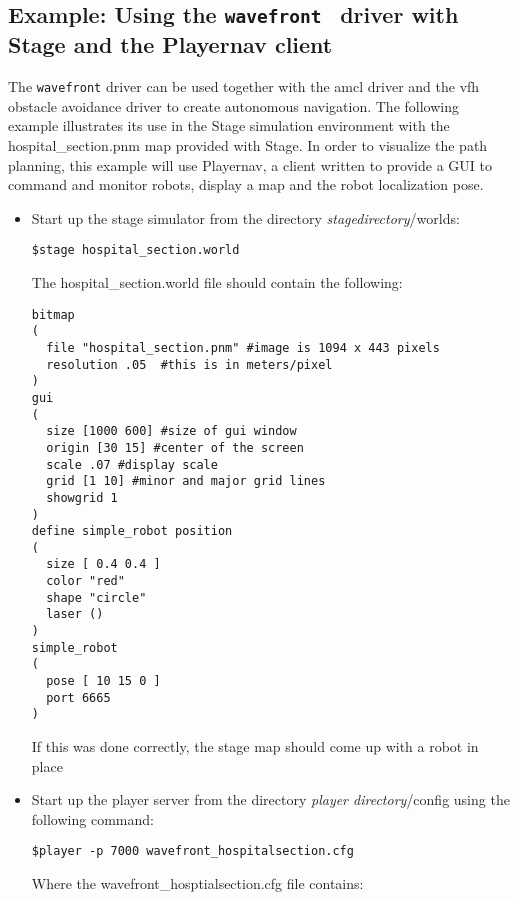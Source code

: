 \subsection*{Example: Using the  {\tt wavefront } driver with Stage and the Playernav client}

The {\tt wavefront} driver can be used together with the  amcl driver
and the vfh obstacle avoidance driver to create autonomous navigation.  The
following example illustrates its use in the Stage simulation environment with the
hospital\_section.pnm map provided with Stage. In order to visualize the path planning, this example will
use Playernav, a client written to provide a GUI to command and monitor robots, display a map and the robot localization pose. 

\begin{itemize}
\item Start up the stage simulator from the directory {\em stagedirectory}/worlds:
\begin{verbatim}
$stage hospital_section.world
\end{verbatim}
The hospital\_section.world file should contain the following:

\begin{verbatim}
bitmap
( 
  file "hospital_section.pnm" #image is 1094 x 443 pixels
  resolution .05  #this is in meters/pixel
)
gui
(
  size [1000 600] #size of gui window
  origin [30 15] #center of the screen
  scale .07 #display scale
  grid [1 10] #minor and major grid lines
  showgrid 1 
)
define simple_robot position
(
  size [ 0.4 0.4 ]
  color "red"
  shape "circle" 
  laser ()
)
simple_robot
( 
  pose [ 10 15 0 ] 
  port 6665 
)
\end{verbatim}

If this was done correctly, the stage map should come up with a robot in place

\item Start up the player server from the directory {\em player directory}/config using the following command:
\begin{verbatim}
$player -p 7000 wavefront_hospitalsection.cfg
\end{verbatim}

Where the wavefront\_hosptialsection.cfg file contains:


\end{itemize}
